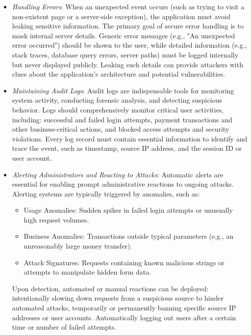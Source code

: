 \begin{itemize}
    \item \textit{Handling Errors}: When an unexpected event occurs (such as trying to visit a non-existent page or a server-side exception), the application must avoid leaking sensitive information. The primary goal of secure error handling is to mask internal server details. Generic error messages (e.g., "An unexpected error occurred") should be shown to the user, while detailed information (e.g., stack traces, database query errors, server paths) must be logged internally but never displayed publicly. Leaking such details can provide attackers with clues about the application's architecture and potential vulnerabilities.
    \item \textit{Maintaining Audit Logs}: Audit logs are indispensable tools for monitoring system activity, conducting forensic analysis, and detecting suspicious behavior. Logs should comprehensively monitor critical user activities, including: successful and failed login attempts, payment transactions and other business-critical actions, and blocked access attempts and security violations. Every log record must contain essential information to identify and trace the event, such as timestamp, source IP address, and the session ID or user account.
    \item \textit{Alerting Administrators and Reacting to Attacks}: Automatic alerts are essential for enabling prompt administrative reactions to ongoing attacks. Alerting systems are typically triggered by anomalies, such as:
    
    \begin{itemize}
        \item Usage Anomalies: Sudden spikes in failed login attempts or unusually high request volumes.
        \item Business Anomalies: Transactions outside typical parameters (e.g., an unreasonably large money transfer).
        \item Attack Signatures: Requests containing known malicious strings or attempts to manipulate hidden form data.
    \end{itemize}

    Upon detection, automated or manual reactions can be deployed: intentionally slowing down requests from a suspicious source to hinder automated attacks, temporarily or permanently banning specific source IP addresses or user accounts. Automatically logging out users after a certain time or number of failed attempts.
    

\end{itemize}
